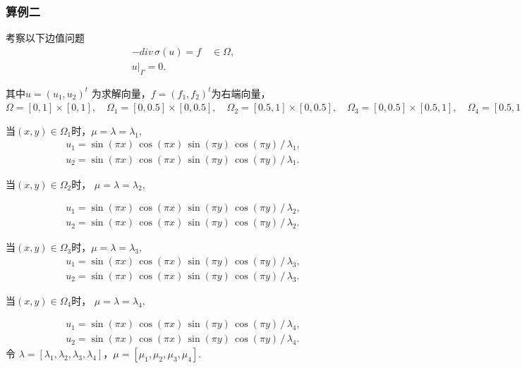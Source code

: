 \documentclass[a4paper,UTF8,titlepage,10pt]{ctexart}
\numberwithin{equation}{subsection}
\begin{document}
\newpage

\subsubsection{算例二}

考察以下边值问题
$$
\begin{matrix}
	-div \, \sigma(u) = f \quad \in \Omega , \\
	u |_{\Gamma} = 0 .
\end{matrix}
$$ 
\par
其中$ u = (u_1,u_2)^t $ 为求解向量，$ f = (f_1,f_2)^t $为右端向量，
$ 
\Omega = [0,1] \times [0,1] , \quad 
\Omega_1 = [0,0.5] \times [0,0.5] , \quad
\Omega_2 = [0.5,1] \times [0,0.5], \quad
\Omega_3 = [0,0.5] \times [0.5,1], \quad
\Omega_4 = [0.5,1] \times [0.5,1].
$ 
\par
当$(x,y) \in \Omega_1$时，$\mu = \lambda = \lambda_1,$
$$
\begin{matrix}
	u_1 = \sin(\pi x) \, \cos(\pi x) \, \sin(\pi y) \, \cos(\pi y) \, / \, \lambda_1 ,
	\\
	u_2 = \sin(\pi x) \, \cos(\pi x) \, \sin(\pi y) \, \cos(\pi y) \, / \, \lambda_1 .
\end{matrix}
$$

当$(x,y) \in \Omega_2$时， $\mu = \lambda = \lambda_2,$

$$
\begin{matrix}
	u_1 = \sin(\pi x) \, \cos(\pi x) \, \sin(\pi y) \, \cos(\pi y) \, / \, \lambda_2 ,
	\\
	u_2 = \sin(\pi x) \, \cos(\pi x) \, \sin(\pi y) \, \cos(\pi y) \, / \, \lambda_2 .
\end{matrix}
$$

当$(x,y) \in \Omega_3$时，$\mu = \lambda = \lambda_3,$ 
$$
\begin{matrix}
	u_1 = \sin(\pi x) \, \cos(\pi x) \, \sin(\pi y) \, \cos(\pi y) \, / \, \lambda_3 ,
	\\
	u_2 = \sin(\pi x) \, \cos(\pi x) \, \sin(\pi y) \, \cos(\pi y) \, / \, \lambda_3 .
\end{matrix}
$$

当$(x,y) \in \Omega_4$时， $\mu = \lambda = \lambda_4,$

$$
\begin{matrix}
	u_1 = \sin(\pi x) \, \cos(\pi x) \, \sin(\pi y) \, \cos(\pi y) \, / \, \lambda_4 ,
	\\
	u_2 = \sin(\pi x) \, \cos(\pi x) \, \sin(\pi y) \, \cos(\pi y) \, / \, \lambda_4 .
\end{matrix}
$$
令 $\lambda = [\lambda_1, \lambda_2, \lambda_3, \lambda_4]$，$\mu = [\mu_1, \mu_2, \mu_3, \mu_4].$ 
\end{document}
